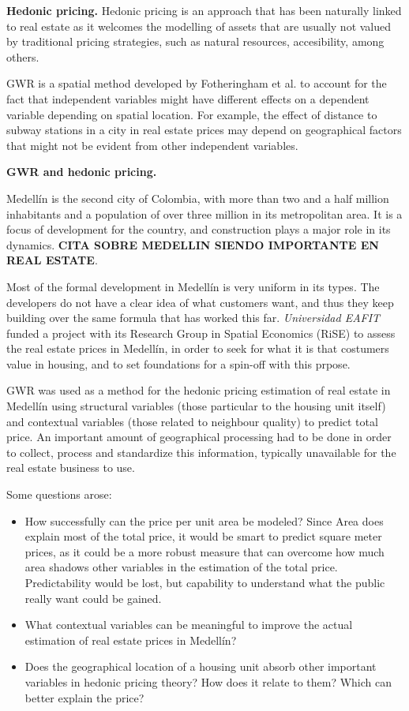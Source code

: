 \documentclass[journal]{IEEEtran}
\begin{document}
\textbf{Hedonic pricing.} Hedonic pricing is an approach that has been naturally linked to real estate as it welcomes the modelling of assets that are usually not valued by traditional pricing strategies, such as natural resources, accesibility, among others.

GWR is a spatial method developed by Fotheringham et al. \cite{fother} to account for the fact that independent variables might have different effects on a dependent variable depending on spatial location. For example, the effect of distance to subway stations in a city in real estate prices may depend on geographical factors that might not be evident from other independent variables.

\textbf{GWR and hedonic pricing.}

Medellín is the second city of Colombia, with more than two and a half million inhabitants and a population of over three million in its metropolitan area. It is a focus of development for the country, and construction plays a major role in its dynamics. \textbf{CITA SOBRE MEDELLIN SIENDO IMPORTANTE EN REAL ESTATE}.

Most of the formal development in Medellín is very uniform in its types. The developers do not have a clear idea of what customers want, and thus they keep building over the same formula that has worked this far. \textit{Universidad EAFIT} funded a project with its Research Group in Spatial Economics (RiSE) to assess the real estate prices in Medellín, in order to seek for what it is that costumers value in housing, and to set foundations for a spin-off with this prpose.

GWR was used as a method for the hedonic pricing estimation of real estate in Medellín using structural variables (those particular to the housing unit itself) and contextual variables (those related to neighbour quality) to predict total price. An important amount of geographical processing had to be done in order to collect, process and standardize this information, typically unavailable for the real estate business to use.

Some questions arose:

\begin{itemize}
\item How successfully can the price per unit area be modeled? Since Area does explain most of the total price, it would be smart to predict square meter prices, as it could be a more robust measure that can overcome how much area shadows other variables in
the estimation of the total price. Predictability would be lost, but capability to understand what the public really want could be gained.

\item What contextual variables can be meaningful to improve the actual estimation of real estate prices in Medellín? 
\item Does the geographical location of a housing unit absorb other important variables in hedonic pricing theory? How does it relate to them? Which can better explain the price?

\end{itemize}
\end{document}
